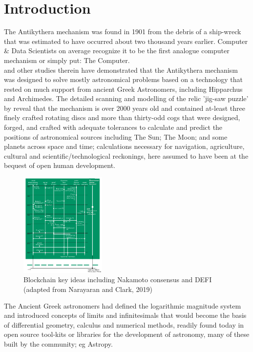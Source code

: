 \documentclass[final,5p,times,twocolumn,authoryear]{elsarticle}
\begin{document}
\section{Introduction}
\label{sec:intro}
%
 The Antikythera mechanism was found in 1901 from the debris of a ship-wreck that was estimated to have occurred about two thousand years earlier. Computer \& Data Scientists on average recognize it to be the first analogue computer mechanism or simply put: The Computer.\\ \citet{Freeth2021} and other studies therein have demonstrated that the Antikythera mechanism was designed to solve mostly astronomical problems based on a technology that rested on much support from ancient Greek Astronomers, including Hipparchus and Archimedes. The detailed scanning and modelling of the relic 'jig-saw puzzle' by \citet{Freeth2021} reveal that the mechanism is over 2000 years old and contained at-least three finely crafted rotating discs and more than thirty-odd cogs that were designed, forged, and crafted with adequate tolerances to calculate and predict the positions of astronomical sources including The Sun; The Moon; and some planets across space and time; calculations necessary for navigation, agriculture, cultural and scientific/technological reckonings, here assumed to have been at the bequest of open human development.
 
 \begin{figure}
    \centering
    \includegraphics[width=0.38\textwidth]{narayanan3.png}
    \vspace*{-0.3cm}
    \caption{Blockchain key ideas including Nakamoto consensus and DEFI (adapted from Narayaran and Clark, 2019)}
    \label{fig:narayanan}
\end{figure}
 
 The Ancient Greek astronomers had defined the logarithmic magnitude system and introduced concepts of limits and infinitesimals that would become the basis of differential geometry, calculus and numerical methods, readily found today in open source tool-kits or  libraries for the development of astronomy, many of these built by the community; eg Astropy.
 
\end{document}
